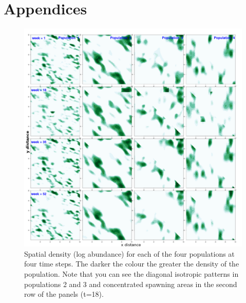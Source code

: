 \documentclass[review]{elsarticle}
\begin{document}
\section*{Appendices}



\clearpage
\footnotesize






\clearpage


\begin{figure}[!ht]
	\includegraphics[width = \linewidth]{Plots/pop_dist}
	\caption{Spatial density (log abundance) for each of the four
		populations at four time steps. The darker the colour the
		greater the density of the population. Note that you can see
		the diagonal isotropic patterns in populations 2 and 3 and
		concentrated spawning areas in the second row of the panels
		(t=18).}
	\label{fig:9}
\end{figure}	
\end{document}
